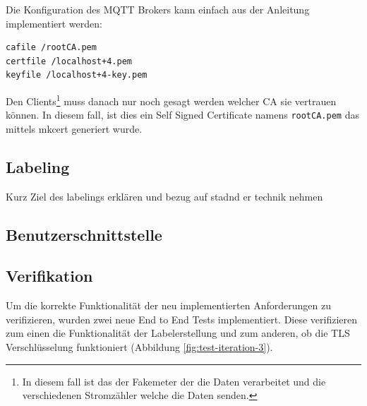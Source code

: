 Die Konfiguration des \ac{MQTT} Brokers kann einfach aus der Anleitung \parencite{mosquitto.conf_man_page_2021}
implementiert werden:

\begin{verbatim}
cafile /rootCA.pem
certfile /localhost+4.pem
keyfile /localhost+4-key.pem
\end{verbatim}

Den Clients\footnote{
    In diesem fall ist das der Fakemeter der die Daten verarbeitet und die verschiedenen
    Stromzähler welche die Daten senden.
} muss danach nur noch gesagt werden welcher \ac{CA} sie vertrauen können.
In diesem fall, ist dies ein Self Signed Certificate namens \texttt{rootCA.pem} das mittels
mkcert generiert wurde.

\subsection{Labeling}
Kurz Ziel des labelings erklären und bezug auf stadnd er technik nehmen

\subsection{Benutzerschnittstelle}

\subsection{Verifikation}

Um die korrekte Funktionalität der neu implementierten Anforderungen zu verifizieren, wurden
zwei neue End to End Tests implementiert. Diese verifizieren zum einen die Funktionalität der
Labelerstellung und zum anderen, ob die \ac{TLS} Verschlüsselung funktioniert (Abbildung \ref{fig:test-iteration-3}).

